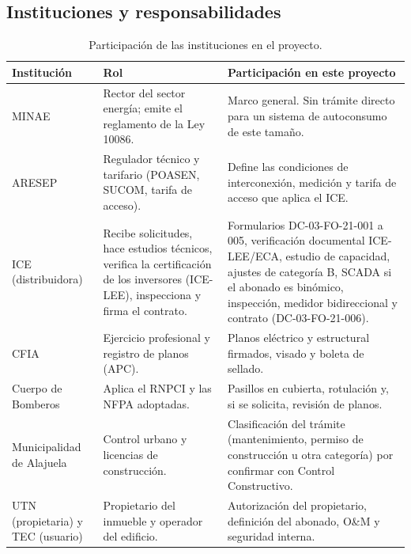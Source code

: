 \documentclass[12pt]{article}
\begin{document}
\subsection{Instituciones y responsabilidades}
\begin{table}[H]
\centering\small
\caption{Participación de las instituciones en el proyecto.}\label{tab:instituciones}
\begin{tabularx}{\textwidth}{L{2.4cm}YY}
\toprule
\textbf{Institución} & \textbf{Rol} & \textbf{Participación en este proyecto}\\
\midrule
MINAE & Rector del sector energía; emite el reglamento de la Ley 10086. & Marco general. Sin trámite directo para un sistema de autoconsumo de este tamaño.\\
ARESEP & Regulador técnico y tarifario (POASEN, SUCOM, tarifa de acceso). & Define las condiciones de interconexión, medición y tarifa de acceso que aplica el ICE.\\
ICE (distribuidora) & Recibe solicitudes, hace estudios técnicos, verifica la certificación de los inversores (ICE-LEE), inspecciona y firma el contrato. & Formularios DC-03-FO-21-001 a 005, verificación documental ICE-LEE/ECA, estudio de capacidad, ajustes de categoría B, SCADA si el abonado es binómico, inspección, medidor bidireccional y contrato (DC-03-FO-21-006).\\
CFIA & Ejercicio profesional y registro de planos (APC). & Planos eléctrico y estructural firmados, visado y boleta de sellado.\\
Cuerpo de Bomberos & Aplica el RNPCI y las NFPA adoptadas. & Pasillos en cubierta, rotulación y, si se solicita, revisión de planos.\\
Municipalidad de Alajuela & Control urbano y licencias de construcción. & Clasificación del trámite (mantenimiento, permiso de construcción u otra categoría) por confirmar con Control Constructivo.\\
UTN (propietaria) y TEC (usuario) & Propietario del inmueble y operador del edificio. & Autorización del propietario, definición del abonado, O\&M y seguridad interna.\\
\bottomrule
\end{tabularx}
\end{table}
\end{document}
